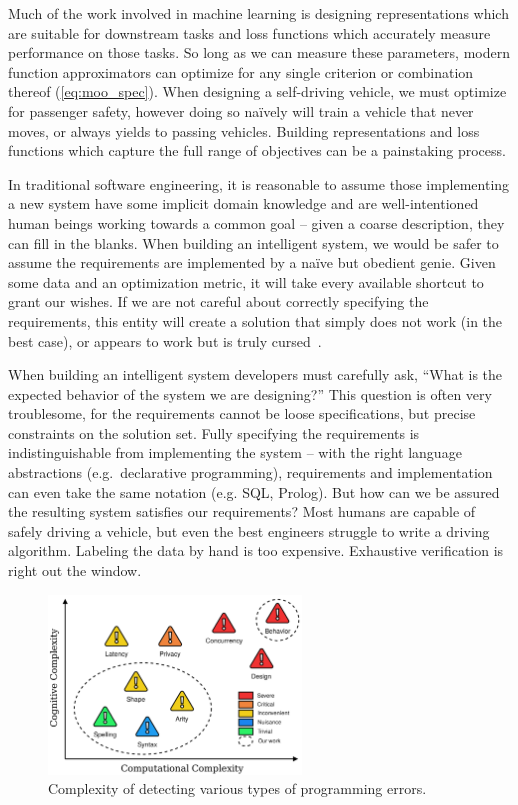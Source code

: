 Much of the work involved in machine learning is designing representations which are suitable for downstream tasks and loss functions which accurately measure performance on those tasks. So long as we can measure these parameters, modern function approximators can optimize for any single criterion or combination thereof (\autoref{eq:moo_spec}). When designing a self-driving vehicle, we must optimize for passenger safety, however doing so na\"ively will train a vehicle that never moves, or always yields to passing vehicles. Building representations and loss functions which capture the full range of objectives can be a painstaking process.

In traditional software engineering, it is reasonable to assume those implementing a new system have some implicit domain knowledge and are well-intentioned human beings working towards a common goal -- given a coarse description, they can fill in the blanks. When building an intelligent system, we would be safer to assume the requirements are implemented by a na\"ive but obedient genie. Given some data and an optimization metric, it will take every available shortcut to grant our wishes. If we are not careful about correctly specifying the requirements, this entity will create a solution that simply does not work (in the best case), or appears to work but is truly cursed~\citep{bellman1957dynamic}.

When building an intelligent system developers must carefully ask, ``What is the expected behavior of the system we are designing?'' This question is often very troublesome, for the requirements cannot be loose specifications, but precise constraints on the solution set. Fully specifying the requirements is indistinguishable from implementing the system -- with the right language abstractions (e.g.\ declarative programming), requirements and implementation can even take the same notation (e.g. SQL, Prolog). But how can we be assured the resulting system satisfies our requirements? Most humans are capable of safely driving a vehicle, but even the best engineers struggle to write a driving algorithm. Labeling the data by hand is too expensive. Exhaustive verification is right out the window.

\begin{figure}
    \centering
    \includegraphics[width=0.60\textwidth]{../figures/verification_complexity.png}
    \caption{Complexity of detecting various types of programming errors.}
    \label{fig:verification_complexity}
\end{figure}

